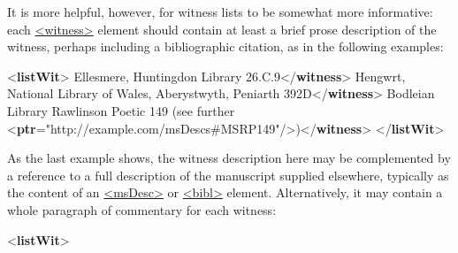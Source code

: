 It is more helpful, however, for witness lists to be somewhat more informative: each \hyperref[TEI.witness]{<witness>} element should contain at least a brief prose description of the witness, perhaps including a bibliographic citation, as in the following examples: \par\bgroup{}\exampleFont \begin{shaded}\noindent\mbox{}{<\textbf{listWit}>}\mbox{}\newline 
{}Ellesmere, Huntingdon Library 26.C.9{</\textbf{witness}>}\mbox{}\newline 
{}Hengwrt, National Library of Wales,\mbox{}\newline 
\hspace*{1em}\hspace*{1em} Aberystwyth, Peniarth 392D{</\textbf{witness}>}\mbox{}\newline 
{}Bodleian Library Rawlinson Poetic 149\mbox{}\newline 
\hspace*{1em}\hspace*{1em} (see further {<\textbf{ptr}\hspace*{1em}{target}="{http://example.com/msDescs\#MSRP149}"/>}){</\textbf{witness}>}\mbox{}\newline 
{</\textbf{listWit}>}\end{shaded}\egroup\par \noindent  As the last example shows, the witness description here may be complemented by a reference to a full description of the manuscript supplied elsewhere, typically as the content of an \hyperref[TEI.msDesc]{<msDesc>} or \hyperref[TEI.bibl]{<bibl>} element. Alternatively, it may contain a whole paragraph of commentary for each witness: \par\bgroup{}\exampleFont \begin{shaded}\noindent\mbox{}{<\textbf{listWit}>}\mbox{}\newline 

\end{shaded}
